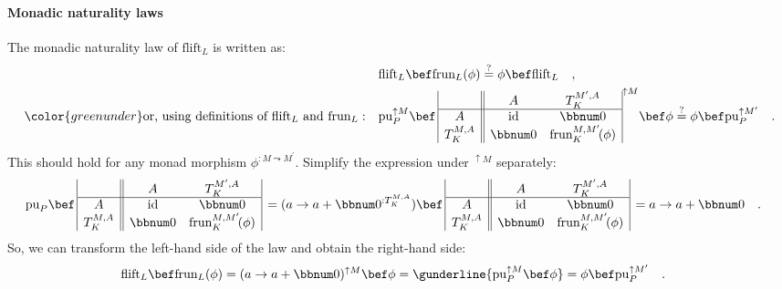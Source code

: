 \paragraph{Monadic naturality laws}

The monadic naturality law of $\text{flift}_{L}$ is written as:
\begin{align*}
 & \text{flift}_{L}\bef\text{frun}_{L}(\phi)\overset{?}{=}\phi\bef\text{flift}_{L}\quad,\\
{\color{greenunder}\text{or, using definitions of }\text{flift}_{L}\text{ and }\text{frun}_{L}:}\quad & \text{pu}_{P}^{\uparrow M}\bef\,\begin{array}{|c||cc|}
 & A & T_{K}^{M^{\prime},A}\\
\hline A & \text{id} & \bbnum 0\\
T_{K}^{M,A} & \bbnum 0 & \text{frun}_{K}^{M,M^{\prime}}\!(\phi)
\end{array}^{\uparrow M}\bef\phi\overset{?}{=}\phi\bef\text{pu}_{P}^{\uparrow M^{\prime}}\quad.
\end{align*}
This should hold for any monad morphism $\phi^{:M\leadsto M^{\prime}}$.
Simplify the expression under $^{\uparrow M}$ separately:
\begin{align*}
 & \text{pu}_{P}\bef\,\begin{array}{|c||cc|}
 & A & T_{K}^{M^{\prime},A}\\
\hline A & \text{id} & \bbnum 0\\
T_{K}^{M,A} & \bbnum 0 & \text{frun}_{K}^{M,M^{\prime}}\!(\phi)
\end{array}\,=(a\rightarrow a+\bbnum 0^{:T_{K}^{M,A}})\bef\,\begin{array}{|c||cc|}
 & A & T_{K}^{M^{\prime},A}\\
\hline A & \text{id} & \bbnum 0\\
T_{K}^{M,A} & \bbnum 0 & \text{frun}_{K}^{M,M^{\prime}}\!(\phi)
\end{array}\,=a\rightarrow a+\bbnum 0\quad.
\end{align*}
So, we can transform the left-hand side of the law and obtain the
right-hand side:
\begin{align*}
 & \text{flift}_{L}\bef\text{frun}_{L}(\phi)=(a\rightarrow a+\bbnum 0)^{\uparrow M}\bef\phi=\gunderline{\text{pu}_{P}^{\uparrow M}\bef\phi}=\phi\bef\text{pu}_{P}^{\uparrow M^{\prime}}\quad.
\end{align*}

